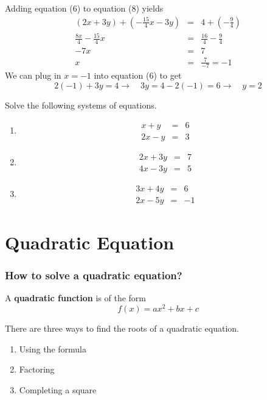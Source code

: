 \begin{frame}
\begin{sol}
Adding equation (6) to equation (8) yields
\begin{eqnarray*}
(2x+3y) + \left(-\frac{15}{4}x - 3y \right) &=& 4 + \left(-\frac{9}{4}\right)\\
\frac{8x}{4} - \frac{15}{4}x &=& \frac{16}{4} - \frac{9}{4} \\
-7x &=& 7 \\
x &=& \frac{7}{-7} = -1
\end{eqnarray*}
We can plug in $x = -1$ into equation (6) to get 
\[ 2(-1) + 3y = 4 \rightarrow \quad  3y = 4 - 2(-1) = 6 \rightarrow \quad y = 2\]
\end{sol}
\end{frame}

\begin{frame}
\begin{exercisebox}{}{}
Solve the following systems of equations.
\begin{enumerate}
\item
\begin{eqnarray*}
x + y &=& 6\\
2x - y &=& 3
\end{eqnarray*}
\item
\begin{eqnarray*}
2x + 3y &=& 7 \\
4x - 3y &=& 5
\end{eqnarray*}
\item
\begin{eqnarray*}
3x + 4y &=& 6 \\
2x - 5y &=& -1
\end{eqnarray*}
\end{enumerate}
\end{exercisebox}
\end{frame}

\section[Quadratic]{Quadratic Equation}
\frame{\sectionpage}

\begin{frame}
\frametitle{How to solve a quadratic equation?}
\begin{defn}{}{}
A \textbf{quadratic function} is of the form
\[ f(x) = ax^2+bx +c\]
\end{defn}

There are three ways to find the roots of a quadratic equation.

\begin{enumerate}
\item Using the formula
\item Factoring
\item Completing a square
\end{enumerate}
\end{frame}


